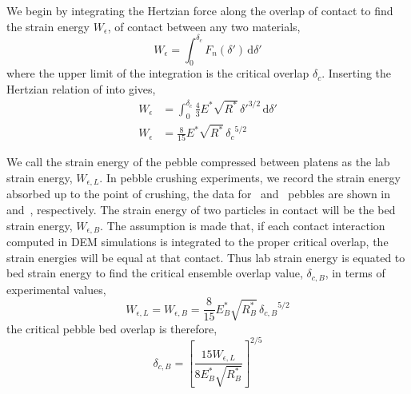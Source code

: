 We begin by integrating the Hertzian force along the overlap of contact to find the strain energy $W_\epsilon$, of contact between any two materials,
\begin{equation}\label{eq:strain-energy-integral}
	W_\epsilon = \int_0^{\delta_c}\!F_n(\delta')\,\mathrm{d}\delta'
\end{equation}
where the upper limit of the integration is the critical overlap $\delta_c$. Inserting the Hertzian relation of  into  gives,
\begin{align}
	W_\epsilon& = \int_0^{\delta_c}\!  \frac{4}{3}E^*\sqrt{R^*}\,\delta'^{3/2} \,\mathrm{d}\delta' \\
	W_\epsilon & = \frac{8}{15}E^*\sqrt{R^*}\, {\delta_c}^{5/2}
\end{align}

We call the strain energy of the pebble compressed between platens as the lab strain energy, $W_{\epsilon,L}$. In pebble crushing experiments, we record the strain energy absorbed up to the point of crushing, the data for \lis~and \lit~pebbles are shown in  and~, respectively. The strain energy of two particles in contact will be the bed strain energy, $W_{\epsilon,B}$. The assumption is made that, if each contact interaction computed in DEM simulations is integrated to the proper critical overlap, the strain energies will be equal at that contact. Thus lab strain energy is equated to bed strain energy to find the critical ensemble overlap value, $\delta_{c,B}$, in terms of experimental values,
\begin{equation}
	W_{\epsilon,L} = W_{\epsilon,B} = \frac{8}{15}E_B^*\sqrt{R_B^*}\, {\delta_{c,B}}^{5/2}
\end{equation}
the critical pebble bed overlap is therefore,
\begin{equation}
	\delta_{c,B} = \left[\frac{15W_{\epsilon,L}}{8E_B^*\sqrt{R_B^*}}\right]^{2/5}
\end{equation}

